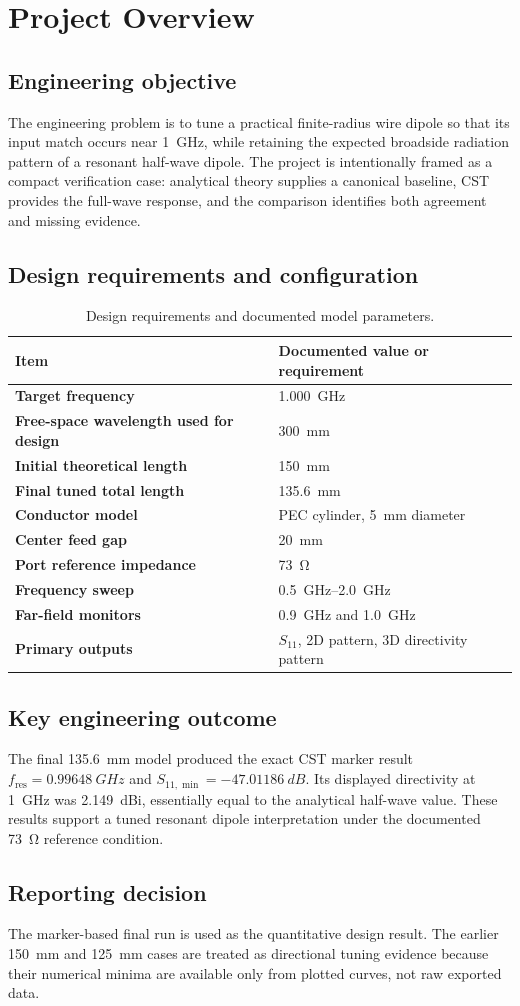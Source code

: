 \section{Project Overview}

\subsection{Engineering objective}
The engineering problem is to tune a practical finite-radius wire dipole so that its
input match occurs near \SI{1}{GHz}, while retaining the expected broadside radiation
pattern of a resonant half-wave dipole. The project is intentionally framed as a compact
verification case: analytical theory supplies a canonical baseline, CST provides the
full-wave response, and the comparison identifies both agreement and missing evidence.

\subsection{Design requirements and configuration}
\begin{table}[H]
\centering
\caption{Design requirements and documented model parameters.}
\label{tab:requirements}
\begin{tabularx}{\textwidth}{>{\bfseries}p{}X}
\toprule
Item & Documented value or requirement \\
\midrule
Target frequency & \SI{1.000}{GHz} \\
Free-space wavelength used for design & \SI{300}{mm} \\
Initial theoretical length & \SI{150}{mm} \\
Final tuned total length & \SI{135.6}{mm} \\
Conductor model & PEC cylinder, \SI{5}{mm} diameter \\
Center feed gap & \SI{20}{mm} \\
Port reference impedance & \SI{73}{\ohm} \\
Frequency sweep & \SIrange{0.5}{2.0}{GHz} \\
Far-field monitors & \SI{0.9}{GHz} and \SI{1.0}{GHz} \\
Primary outputs & $S_{11}$, 2D pattern, 3D directivity pattern \\
\bottomrule
\end{tabularx}
\end{table}

\subsection{Key engineering outcome}
The final \SI{135.6}{mm} model produced the exact CST marker result
$f_{\mathrm{res}}=\SI{0.99648}{GHz}$ and
$S_{11,\min}=-\SI{47.01186}{dB}$. Its displayed directivity at \SI{1}{GHz} was
\SI{2.149}{dBi}, essentially equal to the analytical half-wave value. These results
support a tuned resonant dipole interpretation under the documented \SI{73}{\ohm}
reference condition.

\subsection{Reporting decision}
The marker-based final run is used as the quantitative design result. The earlier
\SI{150}{mm} and \SI{125}{mm} cases are treated as directional tuning evidence because
their numerical minima are available only from plotted curves, not raw exported data.
